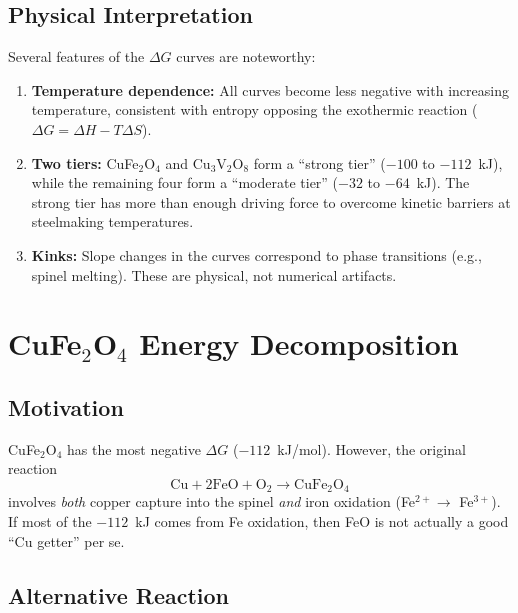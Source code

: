 \documentclass[11pt]{article}
\begin{document}
\subsection{Physical Interpretation}

Several features of the $\Delta G$ curves are noteworthy:

\begin{enumerate}[leftmargin=*]
    \item \textbf{Temperature dependence:} All curves become less negative with increasing temperature, consistent with entropy opposing the exothermic reaction ($\Delta G = \Delta H - T\Delta S$).

    \item \textbf{Two tiers:} CuFe$_2$O$_4$ and Cu$_3$V$_2$O$_8$ form a ``strong tier'' ($-100$ to $-112$~kJ), while the remaining four form a ``moderate tier'' ($-32$ to $-64$~kJ). The strong tier has more than enough driving force to overcome kinetic barriers at steelmaking temperatures.

    \item \textbf{Kinks:} Slope changes in the curves correspond to phase transitions (e.g., spinel melting). These are physical, not numerical artifacts.
\end{enumerate}

\section{CuFe$_2$O$_4$ Energy Decomposition}

\subsection{Motivation}

CuFe$_2$O$_4$ has the most negative $\Delta G$ ($-112$~kJ/mol). However, the original reaction
\begin{equation}
    \text{Cu} + 2\text{FeO} + \text{O}_2 \rightarrow \text{CuFe}_2\text{O}_4
\end{equation}
involves \textit{both} copper capture into the spinel \textit{and} iron oxidation (Fe$^{2+} \rightarrow$ Fe$^{3+}$). If most of the $-112$~kJ comes from Fe oxidation, then FeO is not actually a good ``Cu getter'' per se.

\subsection{Alternative Reaction}
\end{document}
